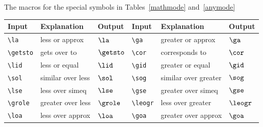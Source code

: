 The macros for the special symbols in Tables~\ref{mathmode} and~\ref{anymode}
%
\begin{table*}
\begin{minipage}{106mm}
\caption{Special symbols which can only be used in math mode.}\label{mathmode}
\begin{tabular}{@{}llllll}
Input & Explanation & Output & Input & Explanation & Output\\
\toprule
\verb"\la"     & less or approx       & $\la$     &
\verb"\ga"     & greater or approx    & $\ga$\\[2pt]
\verb"\getsto" & gets over to         & $\getsto$ &
\verb"\cor"    & corresponds to       & $\cor$\\[2pt]
\verb"\lid"    & less or equal        & $\lid$    &
\verb"\gid"    & greater or equal     & $\gid$\\[2pt]
\verb"\sol"    & similar over less    & $\sol$    &
\verb"\sog"    & similar over greater & $\sog$\\[2pt]
\verb"\lse"    & less over simeq      & $\lse$    &
\verb"\gse"    & greater over simeq   & $\gse$\\[2pt]
\verb"\grole"  & greater over less    & $\grole$  &
\verb"\leogr"  & less over greater    & $\leogr$\\[2pt]
\verb"\loa"    & less over approx     & $\loa$    &
\verb"\goa"    & greater over approx  & $\goa$\\
\bottomrule
\end{tabular}
\end{minipage}
\end{table*}
%
